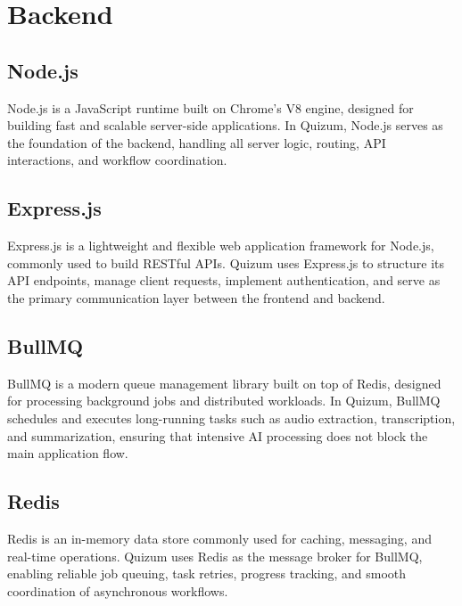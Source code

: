 \section{Backend}

\subsection{Node.js}
Node.js is a JavaScript runtime built on Chrome’s V8 engine, designed for building fast and scalable server-side applications. In Quizum, Node.js serves as the foundation of the backend, handling all server logic, routing, API interactions, and workflow coordination.

\subsection{Express.js}
Express.js is a lightweight and flexible web application framework for Node.js, commonly used to build RESTful APIs. Quizum uses Express.js to structure its API endpoints, manage client requests, implement authentication, and serve as the primary communication layer between the frontend and backend.

\subsection{BullMQ}
BullMQ is a modern queue management library built on top of Redis, designed for processing background jobs and distributed workloads. In Quizum, BullMQ schedules and executes long-running tasks such as audio extraction, transcription, and summarization, ensuring that intensive AI processing does not block the main application flow.

\subsection{Redis}
Redis is an in-memory data store commonly used for caching, messaging, and real-time operations. Quizum uses Redis as the message broker for BullMQ, enabling reliable job queuing, task retries, progress tracking, and smooth coordination of asynchronous workflows.